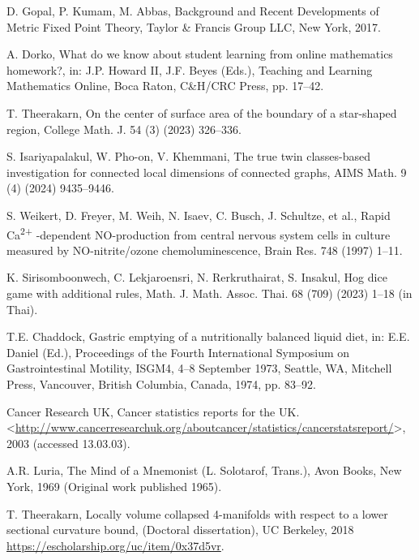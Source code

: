 \documentclass[12pt, a4paper, twoside]{article}
\theoremstyle{plain}
\theoremstyle{definition}
\theoremstyle{remark}
\numberwithin{equation}{section}
\begin{document}
\begin{thebibliography}{99}

D. Gopal, P. Kumam, M. Abbas, Background and Recent Developments of Metric Fixed Point Theory, Taylor \& Francis Group LLC, New York, 2017.

A. Dorko, What do we know about student learning from online mathematics homework?, in: J.P. Howard II, J.F. Beyes (Eds.), Teaching and Learning Mathematics Online, Boca Raton, C\&H/CRC Press, pp. 17--42.

 T. Theerakarn, On the center of surface area of the boundary of a star-shaped region, College Math. J. 54 (3) (2023) 326--336.

 S. Isariyapalakul, W. Pho-on, V. Khemmani, The true twin classes-based investigation for connected local dimensions of connected graphs, AIMS Math. 9 (4) (2024) 9435--9446.

 S. Weikert, D. Freyer, M. Weih, N. Isaev, C. Busch, J. Schultze, et al., Rapid Ca\textsuperscript{2+}
-dependent NO-production from central nervous system cells in culture measured by NO-nitrite/ozone chemoluminescence, Brain
Res. 748 (1997) 1--11.

 K. Sirisomboonwech, C. Lekjaroensri, N. Rerkruthairat, S. Insakul, Hog dice game with additional rules, Math. J. Math. Assoc. Thai. 68 (709) (2023) 1--18 (in Thai). 

T.E. Chaddock, Gastric emptying of a nutritionally balanced liquid diet, in: E.E. Daniel (Ed.),
Proceedings of the Fourth International Symposium on Gastrointestinal Motility, ISGM4, 4--8 September 1973, Seattle,
WA, Mitchell Press, Vancouver, British Columbia, Canada, 1974, pp. 83--92.

 Cancer Research UK, Cancer statistics reports for the UK.
 <\url{http://www.cancerresearchuk.org/aboutcancer/statistics/cancerstatsreport/}>, 2003 (accessed 13.03.03).

 A.R. Luria, The Mind of a Mnemonist (L. Solotarof, Trans.), Avon Books, New York, 1969 (Original
work published 1965).

 T. Theerakarn, Locally volume collapsed 4-manifolds with respect to a lower sectional curvature bound, (Doctoral dissertation), UC Berkeley, 2018 \url{https://escholarship.org/uc/item/0x37d5vr}.


\end{thebibliography}
\end{document}
